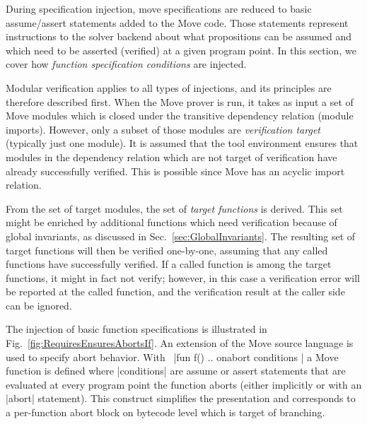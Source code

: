 
During specification injection, move specifications are reduced to basic
assume/assert statements added to the Move code.  Those statements represent
instructions to the solver backend about what propositions can be assumed and
which need to be asserted (verified) at a given program point.  In this section,
we cover how \emph{function specification conditions} are injected.


\label{sec:ModularVerification}

Modular verification applies to all types of injections, and its principles are
therefore described first. When the Move prover is run, it takes as input a set
of Move modules which is closed under the transitive dependency relation (module
imports). However, only a subset of those modules are \emph{verification target}
(typically just one module). It is assumed that the tool environment ensures
that modules in the dependency relation which are not target of verification
have already successfully verified. This is possible since Move has an acyclic
import relation.

From the set of target modules, the set of \emph{target functions} is
derived. This set might be enriched by additional functions which need
verification because of global invariants, as discussed in
Sec.~\ref{sec:GlobalInvariants}. The resulting set of target functions will then
be verified one-by-one, assuming that any called functions have successfully
verified. If a called function is among the target functions, it might in fact
not verify; however, in this case a verification error will be reported at the
called function, and the verification result at the caller side can be ignored.


The injection of basic function specifications is illustrated in
Fig.~\ref{fig:RequiresEnsuresAbortsIf}.  An extension of the Move source
language is used to specify abort behavior. With~%
|fun f() { .. } onabort { conditions }| a Move function is defined where
|conditions| are assume or assert statements that are evaluated at every program
point the function aborts (either implicitly or with an |abort| statement). This
construct simplifies the presentation and corresponds to a per-function abort
block on bytecode level which is target of branching.

